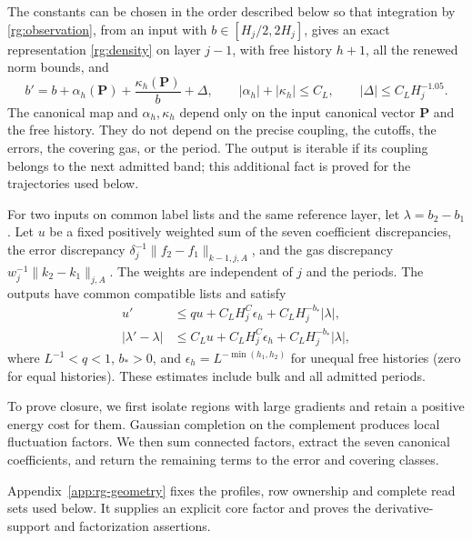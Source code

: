 \begin{theorem}
\label{rg:closure}\label{thm:rg-closure}
The constants can be chosen in the order described below so that
integration by \eqref{rg:observation}, from an input with
$b\in[H_j/2,2H_j]$, gives an exact representation
\eqref{rg:density} on layer $j-1$, with free history $h+1$, all the
renewed norm bounds, and
\begin{equation}
 b'=b+\alpha_h(\mathbf P)+\frac{\kappa_h(\mathbf P)}b+\Delta,
 \qquad |\alpha_h|+|\kappa_h|\le C_L,
 \qquad |\Delta|\le C_LH_j^{-1.05}.
 \label{rg:coupling-step}
\end{equation}
The canonical map and $\alpha_h,\kappa_h$ depend only on the input
canonical vector $\mathbf P$ and the free history.  They do not depend
on the precise coupling, the cutoffs, the errors, the covering gas,
or the period.  The output is iterable if its coupling belongs to the
next admitted band; this additional fact is proved for the trajectories
used below.

For two inputs on common label lists and the same reference layer,
let $\lambda=b_2-b_1$.  Let $u$ be a fixed positively weighted sum of
the seven coefficient discrepancies, the error discrepancy
$\delta_j^{-1}\|f_2-f_1\|_{k-1,j,A}$, and the gas discrepancy
$w_j^{-1}\|k_2-k_1\|_{j,A}$.  The weights are independent of $j$ and
the periods.  The outputs have common compatible lists and satisfy
\begin{align}
 u'&\le q u+C_LH_j^C\epsilon_h+C_LH_j^{-b_*}|\lambda|,
 \label{rg:shape-comparison}\\
 |\lambda'-\lambda|
    &\le C_Lu+C_LH_j^C\epsilon_h+C_LH_j^{-b_*}|\lambda|,
 \label{rg:coupling-comparison}
\end{align}
where $L^{-1}<q<1$, $b_*>0$, and
$\epsilon_h=L^{-\min(h_1,h_2)}$ for unequal free histories
(zero for equal histories).  These estimates include bulk and all
admitted periods.
\end{theorem}

To prove closure, we first isolate regions with large gradients and
retain a positive energy cost for them. Gaussian completion on the
complement produces local fluctuation factors. We then sum connected
factors, extract the seven canonical coefficients, and return the
remaining terms to the error and covering classes.

Appendix~\ref{app:rg-geometry} fixes the profiles, row ownership and
complete read sets used below. It supplies an explicit core factor and
proves the derivative-support and factorization assertions.

